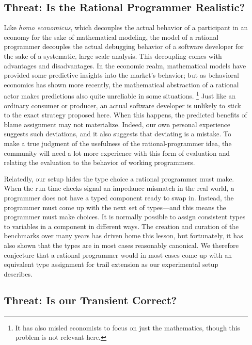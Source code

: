 \subsection{Threat: Is the Rational Programmer Realistic?}

Like {\em homo economicus\/}, which decouples the actual behavior of a
participant in an economy for the sake of mathematical modeling, the model of a
rational programmer decouples the actual debugging behavior of a software
developer for the sake of a systematic, large-scale analysis. This decoupling
comes with advantages and disadvantages. In the economic realm, mathematical models
have provided some predictive insights into the market's behavior; but as
behavioral economics has shown more recently, the mathematical abstraction of a
rational actor makes predictions also quite unreliable in some situations.
\footnote{It has also misled economists to focus on just the mathematics, though
this problem is not relevant here.}  Just like an ordinary consumer or producer,
an actual software developer is unlikely to stick to the exact strategy proposed
here. When this happens, the predicted benefits of blame assignment may not
materialize. Indeed, our own personal experience suggests such deviations, and
it also suggests that deviating is a mistake. To make a true judgment of the
usefulness of the rational-programmer idea, the community will need a lot more
experience with this form of evaluation and relating the evaluation to the
behavior of working programmers.

Relatedly, our setup hides the type choice a rational programmer must make. When the
run-time checks signal an impedance mismatch in the real world, a programmer
does not have a typed component ready to swap in. Instead, the programmer must
come up with the next set of types---and this means the programmer must make
choices. It is normally possible to assign consistent types to variables in a
component in different ways. The creation and curation of the benchmarks over
many years has driven home this lesson, but fortunately, it has also shown that
the types are in most cases reasonably canonical.  We therefore conjecture that
a rational programmer would in most cases come up with an equivalent type
assignment for trail extension as our experimental setup describes.


\subsection{Threat: Is our Transient Correct?}
\label{sec:threat:transient}

